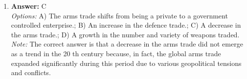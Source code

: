 \documentclass[12pt]{article}
\begin{document}
\begin{enumerate}[label=\arabic*.]
\\ \textit{Note:} The Monroe Doctrine, articulated in 1823 by President James Monroe, established the principle that European powers should refrain from interfering in the affairs of Latin American countries, asserting a protective stance over the Western Hemisphere.
\item \textbf{Answer:} C
\\ \textit{Options:} A) The arms trade shifts from being a private to a government controlled enterprise.; B) An increase in the defence trade.; C) A decrease in the arms trade.; D) A growth in the number and variety of weapons traded.
\\ \textit{Note:} The correct answer is that a decrease in the arms trade did not emerge as a trend in the 20 th century because, in fact, the global arms trade expanded significantly during this period due to various geopolitical tensions and conflicts.
\end{enumerate}
\end{document}
